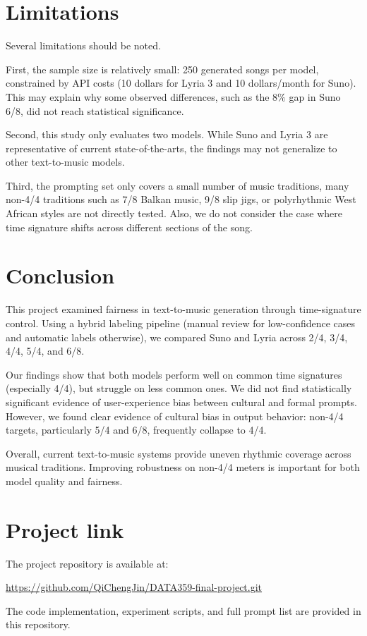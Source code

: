 \documentclass{article}
\begin{document}
\section{Limitations}
Several limitations should be noted. 

First, the sample size is relatively small: 250 generated songs per model, constrained by API costs (10 dollars for Lyria 3 and 10 dollars/month for Suno). This may explain why some observed differences, such as the $8\%$ gap in Suno 6/8, did not reach statistical significance.

Second, this study only evaluates two models. While Suno and Lyria 3 are representative of current state-of-the-arts, the findings may not generalize to other text-to-music models. 

Third, the prompting set only covers a small number of music traditions, many non-4/4 traditions such as 7/8 Balkan music, 9/8 slip jigs, or polyrhythmic West African styles are not directly tested. Also, we do not consider the case where time signature shifts across different sections of the song. 

\section{Conclusion}
This project examined fairness in text-to-music generation through time-signature control. Using a hybrid labeling pipeline (manual review for low-confidence cases and automatic labels otherwise), we compared Suno and Lyria across 2/4, 3/4, 4/4, 5/4, and 6/8.

Our findings show that both models perform well on common time signatures (especially 4/4), but struggle on less common ones. We did not find statistically significant evidence of user-experience bias between cultural and formal prompts. However, we found clear evidence of cultural bias in output behavior: non-4/4 targets, particularly 5/4 and 6/8, frequently collapse to 4/4.

Overall, current text-to-music systems provide uneven rhythmic coverage across musical traditions. Improving robustness on non-4/4 meters is important for both model quality and fairness.


\section{Project link}
The project repository is available at:

\url{https://github.com/QiChengJin/DATA359-final-project.git}

The code implementation, experiment scripts, and full prompt list are provided in this repository.
\end{document}
